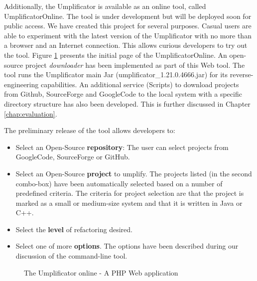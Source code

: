 Additionally, the Umplificator is available as an online tool, called UmplificatorOnline. The tool is under development but will be deployed soon for public access. We have created this project for several purposes. Casual users are able to experiment with the latest version of the Umplificator with no more than a browser and an Internet connection. This allows curious developers to try out the tool. Figure \ref{fig:umpleonline} presents the initial page of the UmplificatorOnline.
An open-source project \textit{downloader} has been implemented as part of this Web tool. The tool runs the  Umplificator main Jar (umplificator\_1.21.0.4666.jar) for its reverse-engineering capabilities. An additional service (Scripts) to download projects from Github, SourceForge and GoogleCode to the local system with a specific directory structure has also been developed. This is further discussed in Chapter \ref{chap:evaluation}.

The preliminary release of the tool allows developers to:

\begin{itemize}
\item Select an Open-Source \textbf{repository}: The user can select projects from GoogleCode, SourceForge or GitHub.
\item Select an Open-Source \textbf{project} to umplify. The projects listed (in the second combo-box) have been automatically selected based on a number of predefined criteria. The criteria for project selection are that the project is marked as a small or medium-size system and that it is written in Java or C++.
\item Select the \textbf{level} of refactoring desired.
\item Select one of more \textbf{options}. The options have been described during our discussion of the command-line tool.
\end{itemize}

\begin{figure}[h]
\centering
{}
\caption{The Umplificator online - A PHP Web application}
\label{fig:umpleonline}
\end{figure}


